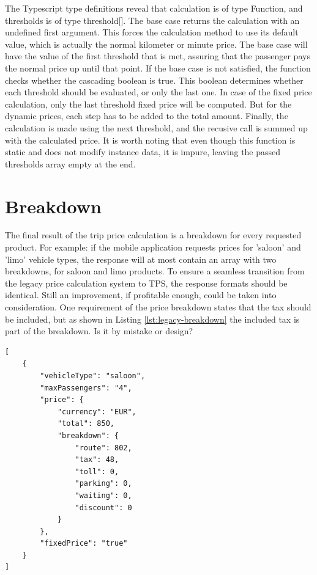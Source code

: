 The Typescript type definitions reveal that calculation is of type Function, and thresholds is of type threshold[]. The base case returns the calculation with an undefined first argument. This forces the calculation method to use its default value, which is actually the normal kilometer or minute price. The base case will have the value of the first threshold that is met, assuring that the passenger pays the normal price up until that point. If the base case is not satisfied, the function checks whether the cascading boolean is true. This boolean determines whether each threshold should be evaluated, or only the last one. In case of the fixed price calculation, only the last threshold fixed price will be computed. But for the dynamic prices, each step has to be added to the total amount. Finally, the calculation is made using the next threshold,  and the recusive call is summed up with the calculated price. It is worth noting that even though this function is static and does not modify instance data, it is impure, leaving the passed thresholds array empty at the end.


\section{Breakdown}
The final result of the trip price calculation is a breakdown for every requested product. For example: if the mobile application requests prices for 'saloon' and 'limo' vehicle types, the response will at most contain an array with two breakdowns, for saloon and limo products. To ensure a seamless transition from the legacy price calculation system to TPS, the response formats should be identical. Still an improvement, if profitable enough, could be taken into consideration. One requirement of the price breakdown states that the tax should be included, but as shown in Listing \ref{lst:legacy-breakdown} the included tax is part of the breakdown. Is it by mistake or design?

\begin{lstlisting}[caption={Legacy price breakdown}, label={lst:legacy-breakdown}]
[
	{
		"vehicleType": "saloon",
		"maxPassengers": "4",
		"price": {
			"currency": "EUR",
			"total": 850,
			"breakdown": {
				"route": 802,
				"tax": 48,
				"toll": 0,
				"parking": 0,
				"waiting": 0,
				"discount": 0
			}
		},
		"fixedPrice": "true"
	}
]
\end{lstlisting}

